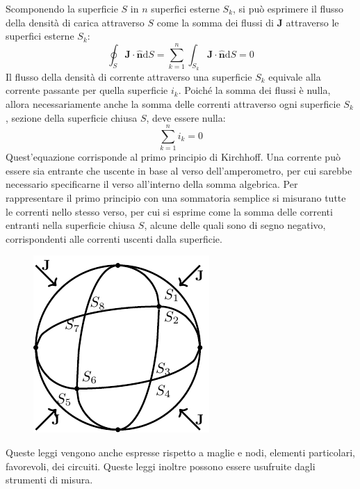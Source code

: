 \documentclass{article}
\newcommand{\vect}[1]{\boldsymbol{\mathbf{#1}}}
\newcommand{\df}{\mathrm{d}}
\numberwithin{equation}{subsection}
\begin{document}
Scomponendo la superficie $S$ in $n$ superfici esterne $S_k$, si può esprimere il flusso della densità di carica attraverso $S$ come la somma dei flussi di $\vect{J}$ attraverso 
le superfici esterne $S_k$:
\begin{equation*}
    \displaystyle\oint_{S}\vect{J}\cdot\hat{\vect{n}}\df S=\sum_{k=1}^n\int_{S_k}\vect{J}\cdot\hat{\vect{n}}\df S=0
\end{equation*}
Il flusso della densità di corrente attraverso una superficie $S_k$ equivale alla corrente passante per quella superficie $i_k$. Poiché la somma dei flussi è nulla, allora 
necessariamente anche la somma delle correnti attraverso ogni superficie $S_k$, sezione della superficie chiusa $S$, deve essere nulla:
\begin{equation}
    \displaystyle\sum_{k=1}^ni_k=0
\end{equation}
Quest'equazione corrisponde al primo principio di Kirchhoff. Una corrente può essere sia entrante che uscente in base al verso dell'amperometro, per cui sarebbe necessario 
specificarne il verso all'interno della somma algebrica. Per rappresentare il primo principio con una sommatoria semplice si misurano tutte le correnti nello stesso verso, 
per cui si esprime come la somma delle correnti entranti nella superficie chiusa $S$, alcune delle quali sono di segno negativo, corrispondenti alle correnti uscenti dalla 
superficie. 

\begin{figure}[H]%
    \centering
    \includegraphics{principio-kirchhoff-correnti.pdf}%
    \label{fig:principio-kirchhoff-correnti}
\end{figure}

Queste leggi vengono anche espresse rispetto a maglie e nodi, elementi particolari, favorevoli, dei circuiti. Queste leggi inoltre possono essere usufruite dagli strumenti di 
misura. 
\end{document}
